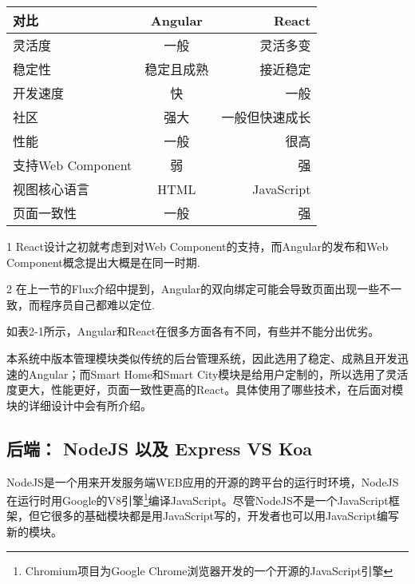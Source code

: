 \begin{table}[!htpb]
  \centering
  \begin{threeparttable}[b]
    \begin{tabular}{lcr}
      \toprule
      对比 & Angular & React \\
      \midrule
      灵活度 & 一般  & 灵活多变 \\
      稳定性 & 稳定且成熟  & 接近稳定 \\
      开发速度 & 快 & 一般\\
      社区 & 强大 & 一般但快速成长 \\
      性能 & 一般 & 很高 \\
      支持Web Component\tnote{1} & 弱 & 强 \\
      视图核心语言 & HTML & JavaScript \\
      页面一致性\tnote{2} & 一般 & 强 \\
      \bottomrule
    \end{tabular}
    \begin{tablenotes}
    \item [1] React设计之初就考虑到对Web Component的支持，而Angular的发布和Web Component概念提出大概是在同一时期.
    \item [2] 在上一节的Flux介绍中提到，Angular的双向绑定可能会导致页面出现一些不一致，而程序员自己都难以定位.
    \end{tablenotes}
  \end{threeparttable}
\end{table}

如表2-1所示，Angular和React在很多方面各有不同，有些并不能分出优劣。

本系统中版本管理模块类似传统的后台管理系统，因此选用了稳定、成熟且开发迅速的Angular；而Smart Home和Smart City模块是给用户定制的，所以选用了灵活度更大，性能更好，页面一致性更高的React。具体使用了哪些技术，在后面对模块的详细设计中会有所介绍。

\subsection{后端： NodeJS 以及 Express VS Koa}
NodeJS是一个用来开发服务端WEB应用的开源的跨平台的运行时环境，NodeJS在运行时用Google的V8引擎\footnote{Chromium项目为Google Chrome浏览器开发的一个开源的JavaScript引擎}编译JavaScript。尽管NodeJS不是一个JavaScript框架，但它很多的基础模块都是用JavaScript写的，开发者也可以用JavaScript编写新的模块。

